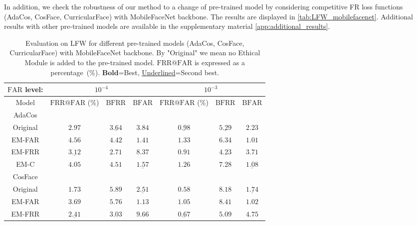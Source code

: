 \documentclass[nohyperref]{article}
\theoremstyle{plain}
\theoremstyle{definition}
\theoremstyle{remark}
\begin{document}
In addition, we check the robustness of our method to a change of pre-trained model by considering competitive FR loss functions (AdaCos, CosFace, CurricularFace) with MobileFaceNet backbone. The results are displayed in \autoref{tab:LFW_mobilefacenet}. Additional results with other pre-trained models are available in the supplementary material \ref{app:additional_results}.






\begin{table*}
\caption{Evaluation on LFW for different pre-trained models (AdaCos, CosFace, CurricularFace) with MobileFaceNet backbone. By "Original" we mean no Ethical Module is added to the pre-trained model. $\mathrm{FRR}@\mathrm{FAR}$ is expressed as a percentage~(\%). $\mathbf{Bold}$=Best, \underline{Underlined}=Second best.}
\vskip 0.1in
\begin{center}
\begin{small}
\begin{sc}
\begin{tabular}{ c | ccc | ccc}
  $\mathrm{FAR}$ level:         & \multicolumn{3}{c}{ $10^{-4}$} & \multicolumn{3}{c}{ $10^{-3}$} \\ 
 \toprule
  Model    & $\mathrm{FRR}@\mathrm{FAR}$ (\%)  & $\mathrm{BFRR}$  & $\mathrm{BFAR}$  & $\mathrm{FRR}@\mathrm{FAR}$ (\%)  & $\mathrm{BFRR}$        & $\mathrm{BFAR}$        \\ \midrule \midrule
  AdaCos&&&&&&\\
\midrule                              Original  & $\mathbf{2.97}$ & $\underline{3.64}$ & $3.84$ & $\underline{0.98}$  & $\underline{5.29}$ & $2.23$ \\
  EM-FAR & $4.56$ & $4.42$ & $\mathbf{1.41}$  & $1.33$ & $6.34$ & $\mathbf{1.01}$  \\
                 EM-FRR & $\underline{3.12}$ & $\mathbf{2.71}$ & $8.37$ & $\mathbf{0.91}$ & $\mathbf{4.23}$  & $3.71$ \\
         EM-C & $4.05$ & $4.51$  & $\underline{1.57}$ & $1.26$ & $7.28$ & $\underline{1.08}$  \\ \midrule \midrule
  CosFace&&&&&&\\
\midrule
             Original  & $\mathbf{1.73}$ & $5.89$ & $\underline{2.51}$ & $\mathbf{0.58}$  & $8.18$  & $\underline{1.74}$  \\
 EM-FAR & $3.69$ & $5.76$ & $\mathbf{1.13}$  & $1.05$ & $8.41$ &  $\mathbf{1.02}$ \\
 EM-FRR & $\underline{2.41}$ & $\mathbf{3.03}$ & $9.66$ & $\underline{0.67}$ & $\mathbf{5.09}$  & $4.75$ \\

\end{tabular}
\end{sc}
\end{small}
\end{center}
\end{table*}
\end{document}
